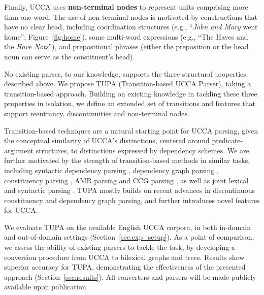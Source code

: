 \documentclass[11pt,a4paper]{article}
\newcommand{\parser}[1]{TUPA\textsubscript{#1}}
\newcommand{\secref}[1]{Section~\ref{#1}}
\newcommand{\figref}[1]{Figure~\ref{#1}}
\begin{document}
Finally, UCCA uses \textbf{non-terminal nodes}
to represent units comprising more than one word.
The use of non-terminal nodes is motivated by constructions that have no clear head, including
coordination structures (e.g., ``\textit{John and Mary} went home''; \figref{fig:home}),
some multi-word expressions (e.g., ``The Haves and the \textit{Have Nots}''),
and prepositional phrases (either the preposition or the head noun can serve as the constituent's head).

No existing parser, to our knowledge, supports the three structural properties described above.
We propose \parser{} (Transition-based UCCA Parser), taking a transition-based approach.
Building on existing knowledge in tackling these three properties
in isolation, we define an extended set of transitions and features
that support reentrancy, discontinuities and non-terminal nodes.

Transition-based techniques are a natural
starting point for UCCA parsing, given the conceptual similarity of UCCA's distinctions,
centered around predicate-argument structures, to distinctions expressed by dependency schemes.
We are further motivated by the strength of transition-based methods
in similar tasks, including syntactic dependency parsing
\cite{dyer2015transition,andor2016globally,kiperwasser2016simple},
dependency graph parsing
\cite{sagae2008shift,ribeyre-villemontedelaclergerie-seddah:2014:SemEval,tokgoz2015transition},
constituency parsing \cite{sagae2005classifier,zhang2009transition,zhu2013fast,maier2015discontinuous,maier-lichte:2016:DiscoNLP},
AMR parsing \cite{wang-xue-pradhan:2015:ACL-IJCNLP,wang2015transition,wang-EtAl:2016:SemEval,dipendra2016neural,goodman2016noise,zhou2016amr,damonte2016incremental}
and CCG parsing \cite{ambati2015incremental,ambati-deoskar-steedman:2016:N16-1},
as well as joint lexical and syntactic parsing
\cite{constant-nivre:2016:P16-1}.
\parser{} mostly builds on recent advances in discontinuous constituency
and dependency graph parsing, and further introduces novel features for UCCA.

We evaluate \parser{} on the available English UCCA corpora, in both
in-domain and out-of-domain settings (\secref{sec:exp_setup}).
As a point of comparison, we assess the ability of existing
parsers to tackle the task, by developing a conversion procedure
from UCCA to bilexical graphs and trees.
Results show superior accuracy for \parser{}, demonstrating the effectiveness of
the presented approach (\secref{sec:results}).
All converters and parsers will be made publicly available upon publication.
\end{document}
